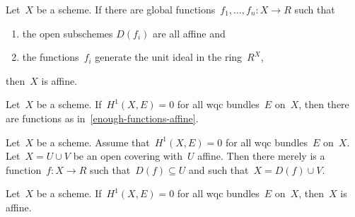 



\begin{lemma}\label{enough-functions-affine}
  Let~$X$ be a scheme. If there are global functions~$f_1,\ldots,f_n : X \to R$
  such that
  \begin{enumerate}
    \item the open subschemes $D(f_i)$ are all affine and
    \item the functions~$f_i$ generate the unit ideal in the ring~$R^X$,
  \end{enumerate}
  then~$X$ is affine.
\end{lemma}

\begin{prop}
  Let~$X$ be a scheme. If~$H^1(X, E) = 0$ for all wqc bundles~$E$ on~$X$, then
  there are functions as in~\cref{enough-functions-affine}.
\end{prop}

\begin{lemma}
  Let~$X$ be a scheme. Assume that~$H^1(X, E) = 0$ for all wqc bundles~$E$
  on~$X$. Let~$X = U \cup V$ be an open covering with~$U$ affine. Then there
  merely is a function~$f : X \to R$ such that~$D(f) \subseteq U$ and such
  that~$X = D(f) \cup V$.
\end{lemma}

\begin{theorem}
  Let~$X$ be a scheme. If~$H^1(X, E) = 0$ for all wqc bundles~$E$
  on~$X$, then~$X$ is affine.
\end{theorem}
